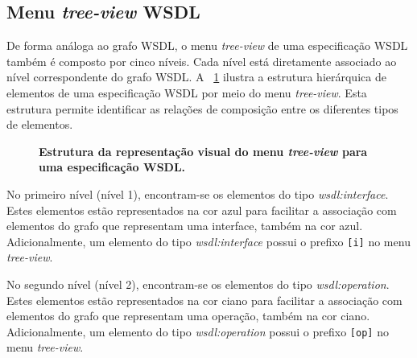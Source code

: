 \subsection{Menu \textit{tree-view} WSDL}\label{4-menu-wsdl}

De forma análoga ao grafo WSDL, o menu \textit{tree-view} de uma especificação WSDL também é composto por cinco níveis. Cada nível está diretamente associado ao nível correspondente do grafo WSDL. A \figurename~\ref{fig:menu-tree-view-wsdl} ilustra a estrutura hierárquica de elementos de uma especificação WSDL por meio do menu \textit{tree-view}. Esta estrutura permite identificar as relações de composição entre os diferentes tipos de elementos.

\begin{figure}[h]
    \centering
    \caption[Estrutura da representação visual do menu \textit{tree-view} para uma especificação WSDL]{\textbf{Estrutura da representação visual do menu \textit{tree-view} para uma especificação WSDL.}}
    \label{fig:menu-tree-view-wsdl}
\end{figure}

No primeiro nível (nível 1), encontram-se os elementos do tipo \textit{wsdl:interface}. Estes elementos estão representados na cor azul para facilitar a associação com elementos do grafo que representam uma interface, também na cor azul. Adicionalmente, um elemento do tipo \textit{wsdl:interface} possui o prefixo \texttt{[i]} no menu \textit{tree-view}.

No segundo nível (nível 2), encontram-se os elementos do tipo \textit{wsdl:operation}. Estes elementos estão representados na cor ciano para facilitar a associação com elementos do grafo que representam uma operação, também na cor ciano. Adicionalmente, um elemento do tipo \textit{wsdl:operation} possui o prefixo \texttt{[op]} no menu \textit{tree-view}.

